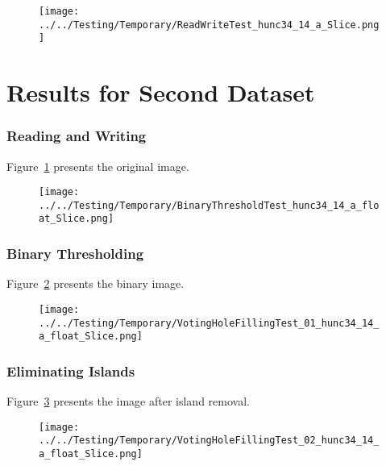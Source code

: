 \documentclass{InsightArticle}
\begin{document}
\clearpage
\begin{figure}
\center
\texttt{[image: ../../Testing/Temporary/ReadWriteTest\_hunc34\_14\_a\_Slice.png]}
\label{fig:OriginalImage2}
\end{figure}

\part{Results for Second Dataset}

\section{Reading and Writing}

Figure~\ref{fig:OriginalImage2} presents the original image.


\clearpage
\begin{figure}
\center
\texttt{[image: ../../Testing/Temporary/BinaryThresholdTest\_hunc34\_14\_a\_float\_Slice.png]}
\label{fig:BinaryImage2}
\end{figure}

\section{Binary Thresholding}

Figure~\ref{fig:BinaryImage2} presents the binary image.


\clearpage
\begin{figure}
\center
\texttt{[image: ../../Testing/Temporary/VotingHoleFillingTest\_01\_hunc34\_14\_a\_float\_Slice.png]}
\label{fig:IslandRemovalImage2}
\end{figure}

\section{Eliminating Islands}

Figure~\ref{fig:IslandRemovalImage2} presents the image after island removal.


\clearpage
\begin{figure}
\center
\texttt{[image: ../../Testing/Temporary/VotingHoleFillingTest\_02\_hunc34\_14\_a\_float\_Slice.png]}
\label{fig:HoleFillingIteration01Image2}
\end{figure}
\end{document}
